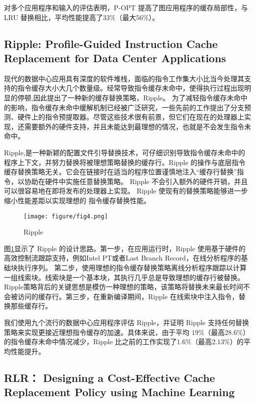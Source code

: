 \documentclass[10pt,journal,compsoc]{IEEEtran}
\begin{document}
对多个应用程序和输入的评估表明，P-OPT 提高了图应用程序的缓存局部性，与 LRU 替换相比，平均性能提高了$33\%$（最大$56\%$）。


\subsection{Ripple: Profile-Guided Instruction Cache Replacement for Data Center Applications}

\hspace{0.5em}现代的数据中心应用具有深度的软件堆栈，面临的指令工作集大小比当今处理其支持的指令缓存大小大几个数量级。经常导致指令缓存未命中，使得执行过程出现明显的停顿,因此提出了一种新的缓存替换策略，Ripple\cite{khan2021ripple}。
为了减轻指令缓存未命中的影响，指令缓存未命中缓解机制已经被广泛研究，一些先前的工作提出了分支预测、硬件上的指令预提取器。尽管这些技术很有前景，但它们在现在的处理器上实现，还需要额外的硬件支持，并且未能达到最理想的情况，也就是不会发生指令未命中。

Ripple,是一种新颖的配置文件引导替换技术，可仔细识别导致指令缓存未命中的程序上下文，并努力替换将被理想策略替换的缓存行。Ripple 的操作与底层指令缓存替换策略无关。它会在链接时在适当的程序位置谨慎地注入“缓存行替换”指令，以协助在硬件中实施任意替换策略。 Ripple 不会引入额外的硬件开销，并且可以很容易地在即将发布的处理器上实现。 Ripple 使现有的替换策略能够进一步缩小性能差距以实现理想的 指令缓存替换性能。

\begin{figure}[!t]
\centering
\texttt{[image: figure/fig4.png]}
\caption{Ripple}
\label{fig_4}
\end{figure}

图\ref{fig_4}显示了 Ripple 的设计思路。第一步，在应用运行时，Ripple 使用基于硬件的高效控制流跟踪支持，例如Intel PT或者Last Branch Record，在线分析程序的基础块执行序列。 第二步，使用理想的指令缓存替换策略离线分析程序跟踪以计算一组线索块。线索块是一个基本块，其执行几乎总是导致理想的缓存行被替换。 Ripple策略背后的关键思想是模仿一种理想的策略，该策略将替换未来最长时间不会被访问的缓存行。第三步，在重新编译期间，Ripple 在线索块中注入指令，替换那些缓存行。

我们使用九个流行的数据中心应用程序评估 Ripple，并证明 Ripple 支持任何替换策略来实现更接近理想指令缓存的加速。具体来说，由于平均 $19\%$（最高$28.6\%$）的指令缓存未命中情况减少，Ripple 比之前的工作实现了$1.6\%$（最高$2.13\%$）的平均性能提升。



\subsection{RLR： Designing a Cost-Effective Cache Replacement Policy using Machine Learning}
\end{document}
